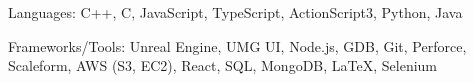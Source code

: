

\begin{cventries}


      
\vspace{-14pt}
  \cventry
    {} %
    {} %
    {} %
    {} %
    {
      \begin{cvitems} %
        \item {Languages: C++, C, JavaScript, TypeScript, ActionScript3, Python, Java}
      \end{cvitems}
    }

\vspace{-14pt}
  \cventry
    {} %
    {} %
    {} %
    {} %
    {
      \begin{cvitems} %
        \item {Frameworks/Tools: Unreal Engine, UMG UI, Node.js, GDB, Git, Perforce, Scaleform, AWS (S3, EC2), React, SQL, MongoDB, \LaTeX, Selenium}
      \end{cvitems}
    }




\end{cventries}
